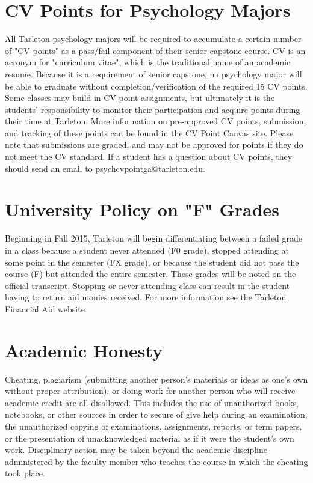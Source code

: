 \documentclass[10pt]{article}
\begin{document}
\section*{CV Points for Psychology Majors}
\label{sec:org18a77f0}
All Tarleton psychology majors will be required to accumulate a certain number of "CV points" as a pass/fail component of their senior capstone course. CV is an acronym for "curriculum vitae", which is the traditional name of an academic resume. Because it is a requirement of senior capstone, no psychology major will be able to graduate without completion/verification of the required 15 CV points. Some classes may build in CV point assignments, but ultimately it is the students’ responsibility to monitor their participation and acquire points during their time at Tarleton. More information on pre-approved CV points, submission, and tracking of these points can be found in the CV Point Canvas site. Please note that submissions are graded, and may not be approved for points if they do not meet the CV standard.  If a student has a question about CV points, they should send an email to psychcvpointga@tarleton.edu.

\section*{University Policy on "F" Grades}
\label{sec:orgb11bf3b}
Beginning in Fall 2015, Tarleton will begin differentiating between a 
failed grade in a class because a student never attended (F0 grade), 
stopped attending at some point in the semester (FX grade), or because 
the student did not pass the course (F) but attended the entire semester. 
These grades will be noted on the official transcript. Stopping or never 
attending class can result in the student having to return aid monies 
received.  For more information see the Tarleton Financial Aid website.

\section*{Academic Honesty}
\label{sec:org630b0bc}

Cheating, plagiarism (submitting another person’s materials or ideas as one’s own without proper attribution), or doing work for another person who will receive academic credit are all disallowed. This includes the use of unauthorized books, notebooks, or other sources in order to secure of give help during an examination, the unauthorized copying of examinations, assignments, reports, or term papers, or the presentation of unacknowledged material as if it were the student’s own work. Disciplinary action may be taken beyond the academic discipline administered by the faculty member who teaches the course in which the cheating took place.
\end{document}
